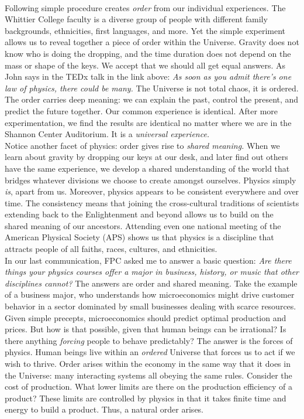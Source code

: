 \documentclass[../../../main.tex]{subfiles}
\begin{document}
\\
\vspace{0.25cm}
Following simple procedure creates \textit{order} from our individual experiences.  The Whittier College faculty is a diverse group of people with different family backgrounds, ethnicities, first languages, and more.  Yet the simple experiment allows us to reveal together a piece of order within the Universe.  Gravity does not know who is doing the dropping, and the time duration does not depend on the mass or shape of the keys.  We accept that we should all get equal answers.  As John says in the TEDx talk in the link above: \textit{As soon as you admit there's one law of physics, there could be many.}  The Universe is not total chaos, it is ordered.  The order carries deep meaning: we can explain the past, control the present, and predict the future together.  Our common experience is identical.  After more experimentation, we find the results are identical no matter where we are in the Shannon Center Auditorium.  It is a \textit{universal experience.}
\\
\vspace{0.25cm}
Notice another facet of physics: order gives rise to \textit{shared meaning.}  When we learn about gravity by dropping our keys at our desk, and later find out others have the same experience, we develop a shared understanding of the world that bridges whatever divisions we choose to create amongst ourselves.  Physics simply \textit{is}, apart from us.  Moreover, physics appears to be consistent everywhere and over time.  The consistency means that joining the cross-cultural traditions of scientists extending back to the Enlightenment and beyond allows us to build on the shared meaning of our ancestors.  Attending even one national meeting of the American Physical Society (APS) shows us that physics is a discipline that attracts people of all faiths, races, cultures, and ethnicities.
\\
\vspace{0.25cm}
In our last communication, FPC asked me to answer a basic question: \textit{Are there things your physics courses offer a major in business, history, or music that other disciplines cannot?}  The answers are order and shared meaning.  Take the example of a business major, who understands how microeconomics might drive customer behavior in a sector dominated by small businesses dealing with scarce resources.  Given simple precepts, microeconomics should predict optimal production and prices.  But how is that possible, given that human beings can be irrational?  Is there anything \textit{forcing} people to behave predictably?  The answer is the forces of physics.  Human beings live within an \textit{ordered} Universe that forces us to act if we wish to thrive.  Order arises within the economy in the same way that it does in the Universe: many interacting systems all obeying the same rules.  Consider the cost of production.  What lower limits are there on the production efficiency of a product?  These limits are controlled by physics in that it takes finite time and energy to build a product.  Thus, a natural order arises.
\end{document}
